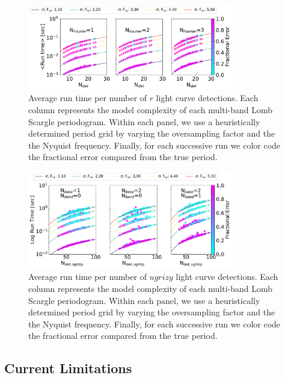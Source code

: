 \documentclass[DM,authoryear,toc]{lsstdoc}
\begin{document}
 
 \begin{figure}
  \includegraphics[width=0.8\textwidth]{figures/singleRUN_LSP_RRL.pdf}
  \centering 
  \caption{Average run time per number of $r$ light curve detections. Each column represents the model complexity of each multi-band Lomb Scargle periodogram. Within each panel, we use a heuristically determined period grid by varying the oversampling factor and the the Nyquist frequency.  Finally, for each successive run we color code the fractional error compared from the true period.}
  \label{fig:run_time_single}
\end{figure}



\begin{figure}
  \includegraphics[width=0.8\textwidth]{figures/multi-lsp-runs.pdf}
  \centering 
  \caption{Average run time per number of $ugrizy$ light curve detections. Each column represents the model complexity of each multi-band Lomb Scargle periodogram. Within each panel, we use a heuristically determined period grid by varying the oversampling factor and the the Nyquist frequency.  Finally, for each successive run we color code the fractional error compared from the true period.}
\end{figure}

\subsection{Current Limitations}
\end{document}
